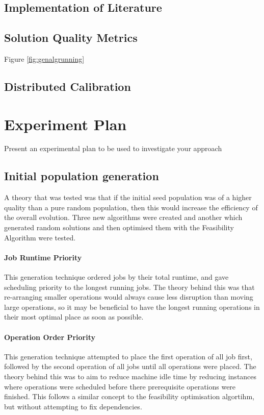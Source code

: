 \documentclass[14pt]{acmsiggraph}
\begin{document}
\subsection{Implementation of Literature}
\lipsum[7]

\subsection{Solution Quality Metrics}
Figure \ref{fig:genalgrunning}
\lipsum[7]

\subsection{Distributed Calibration }
\lipsum[7]


\section{Experiment Plan}
Present an experimental plan to be used to investigate your approach
\lipsum[7]
\subsection{Initial population generation}
A theory that was tested was that if the initial seed population was of a higher quality than a pure random population, then this would increase the efficiency of the overall evolution. Three new algorithms were created and another which generated random solutions and then optimised them with the Feasibility Algorithm were tested.

\paragraph{Job Runtime Priority}
This generation technique ordered jobs by their total runtime, and gave  scheduling priority to the longest running jobs. The theory behind this was that re-arranging smaller operations would always cause less disruption than moving large operations, so it may be beneficial to have the longest running operations in their most optimal place as soon as possible.

\paragraph{Operation Order Priority}
This generation technique attempted to place the first operation of all job first, followed by the second operation of all jobs until all operations were placed. The theory behind this was to aim to reduce machine idle time by reducing instances where operations were scheduled before there prerequisite operations were finished. This follows a similar concept to the feasibility optimisation algortihm, but without attempting to fix dependencies.
\end{document}
